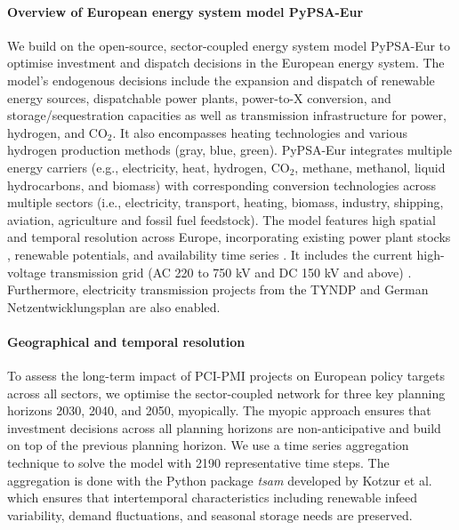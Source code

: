 \documentclass[pdflatex,sn-nature]{sn-jnl}%
\theoremstyle{thmstyleone}%
\theoremstyle{thmstyletwo}%
\theoremstyle{thmstylethree}%
\begin{document}
\paragraph{Overview of European energy system model PyPSA-Eur}
We build on the open-source, sector-coupled energy system model PyPSA-Eur \cite{neumannPotentialRoleHydrogen2023,frysztackiComparisonClusteringMethods2022,glaumOffshorePowerHydrogen2024,horschPyPSAEurOpenOptimisation2018} to optimise investment and dispatch decisions in the European energy system. The model's endogenous decisions include the expansion and dispatch of renewable energy sources, dispatchable power plants, power-to-X conversion, and storage/sequestration capacities as well as transmission infrastructure for power, hydrogen, and CO$_2$. It also encompasses heating technologies and various hydrogen production methods (gray, blue, green).
PyPSA-Eur integrates multiple energy carriers (e.g., electricity, heat, hydrogen, CO$_2$, methane, methanol, liquid hydrocarbons, and biomass) with corresponding conversion technologies across multiple sectors (i.e., electricity, transport, heating, biomass, industry, shipping, aviation, agriculture and fossil fuel feedstock). The model features high spatial and temporal resolution across Europe, incorporating existing power plant stocks \cite{gotzensPerformingEnergyModelling2019}, renewable potentials, and availability time series \cite{hofmannAtliteLightweightPython2021}. It includes the current high-voltage transmission grid (AC 220 to 750 kV and DC 150 kV and above) \cite{xiongModellingHighvoltageGrid2025}. Furthermore, electricity transmission projects from the TYNDP \cite{entso-eTenYearNetworkDevelopment2020} and German Netzentwicklungsplan \cite{bnetzaBestaetigungNetzentwicklungsplanStrom2024} are also enabled.

\paragraph{Geographical and temporal resolution}
To assess the long-term impact of PCI-PMI projects on European policy targets across all sectors, we optimise the sector-coupled network for three key planning horizons 2030, 2040, and 2050, myopically. The myopic approach ensures that investment decisions across all planning horizons are non-anticipative and build on top of the previous planning horizon. We use a time series aggregation technique to solve the model with 2190 representative time steps. The aggregation is done with the Python package \textit{tsam} developed by Kotzur et al. \cite{kotzurImpactDifferentTime2018} which ensures that intertemporal characteristics including renewable infeed variability, demand fluctuations, and seasonal storage needs are preserved.
\end{document}
